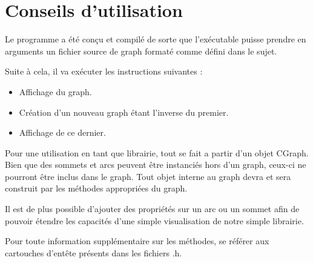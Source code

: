 	\chapter{Conseils d'utilisation}%
	Le programme a été conçu et compilé de sorte que l'exécutable puisse prendre en arguments un fichier source de graph formaté comme défini dans le sujet.
	
	Suite à cela, il va exécuter les instructions suivantes :
	\begin{itemize}
		\item Affichage du graph.
		\item Création d'un nouveau graph étant l'inverse du premier.
		\item Affichage de ce dernier. \\
	\end{itemize}
	Pour une utilisation en tant que librairie, tout se fait a partir d'un objet CGraph. Bien que des sommets et arcs peuvent être instanciés hors d'un graph, ceux-ci ne pourront être inclus dans le graph. Tout objet interne au graph devra et sera construit par les méthodes appropriées du graph.
	
	Il est de plus possible d'ajouter des propriétés sur un arc ou un sommet afin de pouvoir étendre les capacités d'une simple visualisation de notre simple librairie.

	Pour toute information supplémentaire sur les méthodes, se référer aux cartouches d'entête présents dans les fichiers .h.

